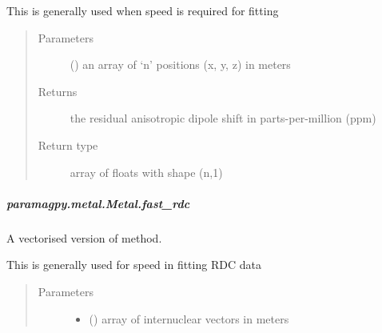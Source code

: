 \documentclass[a4paper,10pt,english,openany,oneside]{sphinxmanual}
\begin{document}
\begin{fulllineitems}
\begin{fulllineitems}
\begin{fulllineitems}
This is generally used when speed is required for fitting
\begin{quote}\begin{description}
\item[{Parameters}] \leavevmode
{} (\sphinxstyleliteralemphasis{\sphinxupquote{ (}}\sphinxstyleliteralemphasis{\sphinxupquote{,}}\sphinxstyleliteralemphasis{\sphinxupquote{)}}) \textendash{} an array of ‘n’ positions (x, y, z) in meters

\item[{Returns}] \leavevmode
{} \textendash{} the residual anisotropic dipole shift in parts-per-million (ppm)

\item[{Return type}] \leavevmode
array of floats with shape (n,1)

\end{description}\end{quote}

\end{fulllineitems}



\subparagraph{paramagpy.metal.Metal.fast\_rdc}
\label{\detokenize{reference/generated/paramagpy.metal.Metal.fast_rdc:paramagpy-metal-metal-fast-rdc}}\label{\detokenize{reference/generated/paramagpy.metal.Metal.fast_rdc::doc}}

\begin{fulllineitems}
\label{\detokenize{reference/generated/paramagpy.metal.Metal.fast_rdc:paramagpy.metal.Metal.fast_rdc}}
A vectorised version of {\hyperref[\detokenize{reference/generated/paramagpy.metal.Metal.rdc:paramagpy.metal.Metal.rdc}]{}} method.

This is generally used for speed in fitting RDC data
\begin{quote}\begin{description}
\item[{Parameters}] \leavevmode\begin{itemize}
\item {} 
 (\sphinxstyleliteralemphasis{\sphinxupquote{ (}}\sphinxstyleliteralemphasis{\sphinxupquote{,}}\sphinxstyleliteralemphasis{\sphinxupquote{)}}) \textendash{} array of internuclear vectors in meters


\end{itemize}
\end{description}
\end{quote}
\end{fulllineitems}
\end{fulllineitems}
\end{fulllineitems}
\end{document}
